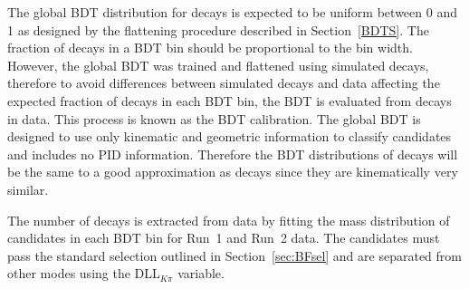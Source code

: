 The global BDT distribution for \bmumu decays is expected to be uniform between 0 and 1 as designed by the flattening procedure described in Section~\ref{BDTS}. The fraction of \bmumu decays in a BDT bin should be proportional to the bin width. However, the global BDT was trained and flattened using simulated decays, therefore to avoid differences between simulated decays and data affecting the expected fraction of \bmumu decays in each BDT bin, the BDT \pdf is evaluated from \bdkpi decays in data. This process is known as the BDT calibration.
The global BDT is designed to use only kinematic and geometric information to classify candidates and includes no PID information. Therefore the BDT distributions of \bdkpi decays will be the same to a good approximation as \bmumu decays since they are kinematically very similar. %

The number of \bdkpi decays is extracted from data by fitting the mass distribution of \bdkpi candidates in each BDT bin for Run~1 and Run~2 data. The \bdkpi candidates must pass the standard \bhh selection outlined in Section~\ref{sec:BFsel} and are separated from other \bhh modes using the DLL$_{K\pi}$ variable. %

